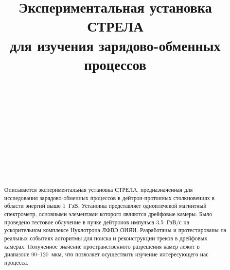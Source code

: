 \documentclass[aps,12pt,final,notitlepage,oneside,onecolumn,nobibnotes,
  nofootinbib,superscriptaddress,noshowpacs,centertags]{revtex4}
\begin{document}

\title{Экспериментальная установка СТРЕЛА \\
  для изучения зарядово-обменных процессов}
\author{~}
\author{~}
\author{~}
\author{~}
\author{~}
\author{~}

\begin{abstract}
  Описывается экспериментальная установка СТРЕЛА, предназначенная для
  исследования зарядово-обменных процессов в дейтрон-протонных столкновениях в
  области энергий выше 1~ГэВ. Установка представляет одноплечевой магнитный
  спектрометр, основными элементами которого являются дрейфовые камеры. Было
  проведено тестовое облучение в пучке дейтронов импульса 3.5~ГэВ/с на
  ускорительном комплексе Нуклотрона ЛФВЭ ОИЯИ. Разработаны и протестированы на
  реальных событиях алгоритмы для поиска и реконструкции треков в дрейфовых
  камерах. Полученное значение пространственного разрешения камер лежит в
  диапазоне 90--120~мкм, что позволяет осуществить изучение интересующего нас
  процесса.
\end{abstract}

\maketitle




%
\end{document}
